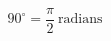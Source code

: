 \documentclass[preview]{standalone}
\begin{document}
\begin{align*}
90^\circ = \dfrac{\pi}{2}\ \text{radians}
\end{align*}
\end{document}
